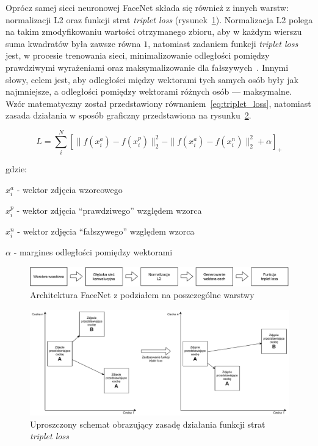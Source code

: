 Oprócz samej sieci neuronowej FaceNet składa się również z innych warstw: normalizacji L2 oraz
funkcji strat \textit{triplet loss} (rysunek~\ref{fig:facenet_arch}).
Normalizacja L2 polega na takim zmodyfikowaniu wartości otrzymanego zbioru, aby w każdym wierszu
suma kwadratów była zawsze równa $1$,
natomiast zadaniem funkcji \textit{triplet loss} jest, w procesie trenowania sieci,
minimalizowanie odległości pomiędzy prawdziwymi
wyrażeniami oraz maksymalizowanie dla fałszywych~\cite{chechik2010large}.
Innymi słowy, celem jest, aby odległości między wektorami tych samych osób były jak najmniejsze,
a odległości pomiędzy wektorami różnych osób --- maksymalne.
Wzór matematyczny został przedstawiony równaniem~\ref{eq:triplet_loss},
natomiast zasada działania w sposób graficzny przedstawiona na rysunku~\ref{fig:triplet_loss}.


\begin{equation}
    L = \sum_{i}^{N} [  \| f(x_i^a) - f(x_i^p) \| ^2_2 - \| f(x_i^a) - f(x_i^n) \| ^2_2 + \alpha ] _+
    \label{eq:triplet_loss}
\end{equation}

gdzie:

$x_i^a$ - wektor zdjęcia wzorcowego

$x_i^p$ - wektor zdjęcia ``prawdziwego'' względem wzorca

$x_i^n$ - wektor zdjęcia ``fałszywego'' względem wzorca

$\alpha$ - margines odległości pomiędzy wektorami

\pagebreak

\begin{figure}[]
    \centering
    \includegraphics[width=1\textwidth]{images/facenet_arch}
    \caption{ Architektura FaceNet z podziałem na poszczególne warstwy }
    \customsource
    \label{fig:facenet_arch}
\end{figure}

\begin{figure}[]
    \centering
    \includegraphics[width=1\textwidth]{images/triplet_loss}
    \caption{ Uproszczony schemat obrazujący zasadę działania funkcji strat \textit{triplet loss} }
    \customsource
    \label{fig:triplet_loss}
\end{figure}


